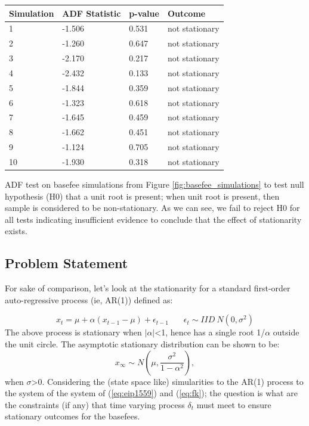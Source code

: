 \documentclass[futureinternet,article,submit,moreauthors,dvi2pdf]{mdpi}
\begin{document}
\begin{specialtable}[H] 
\centering
\begin{tabular}{llll} 
\toprule
 Simulation & ADF Statistic & p-value & Outcome \\
\midrule
1 & -1.506 & 0.531 & not stationary \\
2 & -1.260 & 0.647 & not stationary \\
3 & -2.170 & 0.217 & not stationary \\
4 & -2.432 & 0.133 & not stationary \\
5 & -1.844 & 0.359 & not stationary \\
6 & -1.323 & 0.618 & not stationary \\
7 & -1.645 & 0.459 & not stationary \\
8 & -1.662 & 0.451 & not stationary \\
9 & -1.124 & 0.705 & not stationary \\
10 & -1.930 & 0.318 & not stationary \\
\bottomrule
\end{tabular}
\caption{ADF test on basefee simulations from Figure \ref{fig:basefee_simulations} to test null hypothesis (H0) that a unit root is present; when unit root is present, then sample is considered to be non-stationary. As we can see, we fail to reject H0 for all tests indicating insufficient evidence to conclude that the effect of stationarity exists.}
\label{table:pow_vs_pos}
\end{specialtable}

\subsection{Problem Statement}
\label{section:problem_statement}
For sake of comparison, let's look at the stationarity for a standard first-order auto-regressive process  (ie, AR(1)) defined as:

\begin{equation}
x_{t} = \mu + \alpha (x_{t-1} -\mu) + \epsilon_{t-1} ~~~~~~~~ \epsilon_{t} \sim IID~N(0,\sigma^2)
\label{eq:ar1} 
\end{equation}
The above process is stationary when $|\alpha|$<1, hence has a single root 1/$\alpha$ outside the unit circle. The asymptotic stationary distribution can be shown to be:
\begin{equation}
x_{\infty} \sim N(\mu,\frac{\sigma^2}{1-\alpha^2}),
\label{eq:x_infinity} 
\end{equation}
when $\sigma$>0. Considering the (state space like) simularities to the AR(1) process to the system of the system of (\ref{eq:eip1559}) and (\ref{eq:fk}); the question is what are the constraints (if any) that time varying process $\delta_{t}$ must meet to ensure stationary outcomes for the basefees.
\end{document}
